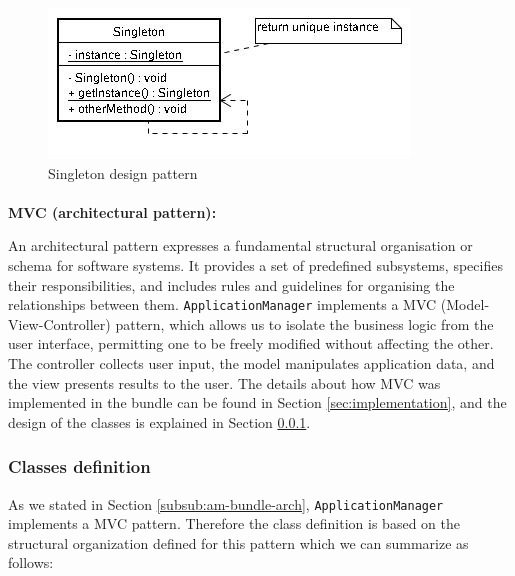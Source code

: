 \begin{figure}[h!]
 \begin{center}
 \includegraphics[scale=0.7]{img/singleton.jpg}
  \caption{\label{img:singleton}Singleton design pattern}
 \end{center}
\end{figure}

\paragraph{}

\textbf{MVC (architectural pattern):}\newline

An architectural pattern expresses a fundamental structural organisation or
schema for software systems. It provides a set of predefined subsystems,
specifies their responsibilities, and includes rules and
guidelines for organising the relationships between them.
\newline
\verb|ApplicationManager| implements a MVC (Model-View-Controller) pattern,
which allows us to isolate the business logic from the user interface, permitting one
to be freely modified without affecting the other. The controller collects
user input, the model manipulates application data, and the view presents
results to the user.
\newline
The details about how MVC was implemented in the bundle can be found in Section
\ref{sec:implementation}, and the design of the classes is explained in
Section \ref{subsub:am-classes-definition}.


\subsubsection{Classes definition}
\label{subsub:am-classes-definition}
As we stated in Section \ref{subsub:am-bundle-arch}, \verb|ApplicationManager|
implements a MVC pattern. Therefore the class definition is based on the structural
organization defined for this pattern which we can summarize as follows:

